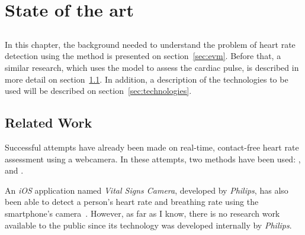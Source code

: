 \chapter{State of the art} \label{chap:sota}

\section*{}





In this chapter, the background needed to understand the problem of 
heart rate detection using the \evm{} method is presented on 
section~\ref{sec:evm}. Before that, a similar research, which uses the 
\ica{} model to assess the cardiac pulse, is described in more 
detail on section~\ref{sec:relatedwork}. In addition, a description of the 
technologies to be used will be described on section~\ref{sec:technologies}.

\section{Related Work} \label{sec:relatedwork}

Successful attempts have already been made on real-time, contact-free 
heart rate assessment using a webcamera. In these attempts, two methods 
have been used: \ica{}, and \evm{}.

An \emph{iOS} application named \emph{Vital Signs Camera}, developed by 
\emph{Philips}, has also been able to detect a person's heart rate and 
breathing rate using the smartphone's camera~\cite{Philips2013}. 
However, as far as I know, there is no research work available to 
the public since its technology was developed internally by \emph{Philips}.

\subsection{\ica} \label{sec:ica}

